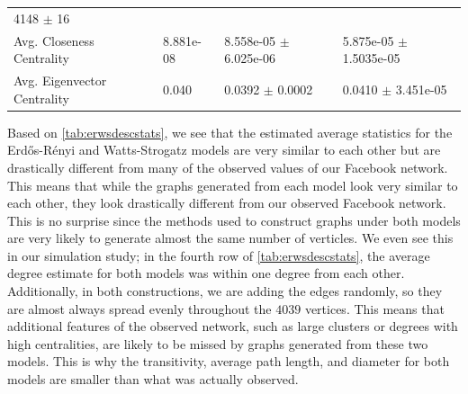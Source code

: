 \documentclass[12pt,twoside]{amherstthesis}
\begin{document}
\begin{longtable}[]{@{}llll@{}}
\begin{minipage}[t]{0.26\columnwidth}
  4148 \(\pm\) 16\strut
  \end{minipage}\tabularnewline
  \begin{minipage}[t]{0.28\columnwidth}\raggedright\strut
  Avg. Closeness Centrality\strut
  \end{minipage} & \begin{minipage}[t]{0.11\columnwidth}\raggedright\strut
  8.881e-08\strut
  \end{minipage} & \begin{minipage}[t]{0.24\columnwidth}\raggedright\strut
  8.558e-05 \(\pm\) 6.025e-06\strut
  \end{minipage} & \begin{minipage}[t]{0.26\columnwidth}\raggedright\strut
  5.875e-05 \(\pm\) 1.5035e-05\strut
  \end{minipage}\tabularnewline
  \begin{minipage}[t]{0.28\columnwidth}\raggedright\strut
  Avg. Eigenvector Centrality\strut
  \end{minipage} & \begin{minipage}[t]{0.11\columnwidth}\raggedright\strut
  0.040\strut
  \end{minipage} & \begin{minipage}[t]{0.24\columnwidth}\raggedright\strut
  0.0392 \(\pm\) 0.0002\strut
  \end{minipage} & \begin{minipage}[t]{0.26\columnwidth}\raggedright\strut
  0.0410 \(\pm\) 3.451e-05\strut
  \end{minipage}\tabularnewline
  \bottomrule
  \end{longtable}
  
  Based on \autoref{tab:erwsdescstats}, we see that the estimated average
  statistics for the Erdős-Rényi and Watts-Strogatz models are very
  similar to each other but are drastically different from many of the
  observed values of our Facebook network. This means that while the
  graphs generated from each model look very similar to each other, they
  look drastically different from our observed Facebook network. This is
  no surprise since the methods used to construct graphs under both models
  are very likely to generate almost the same number of verticles. We even
  see this in our simulation study; in the fourth row of
  \autoref{tab:erwsdescstats}, the average degree estimate for both models
  was within one degree from each other. Additionally, in both
  constructions, we are adding the edges randomly, so they are almost
  always spread evenly throughout the \(4039\) vertices. This means that
  additional features of the observed network, such as large clusters or
  degrees with high centralities, are likely to be missed by graphs
  generated from these two models. This is why the transitivity, average
  path length, and diameter for both models are smaller than what was
  actually observed.
  
\end{document}
